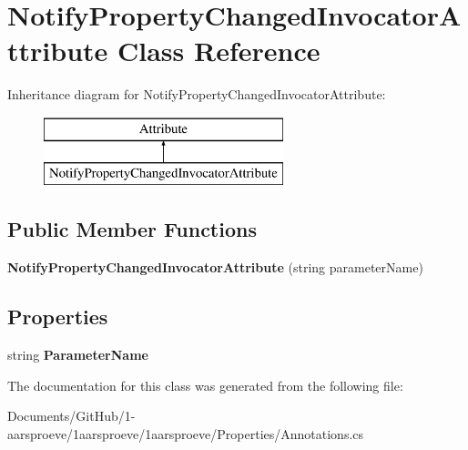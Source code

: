 \hypertarget{class_notify_property_changed_invocator_attribute}{}\section{Notify\+Property\+Changed\+Invocator\+Attribute Class Reference}
\label{class_notify_property_changed_invocator_attribute}
Inheritance diagram for Notify\+Property\+Changed\+Invocator\+Attribute\+:\begin{figure}[H]
\begin{center}
\leavevmode
\includegraphics[height=2.000000cm]{class_notify_property_changed_invocator_attribute}
\end{center}
\end{figure}
\subsection*{Public Member Functions}
\begin{DoxyCompactItemize}
\item 
\hypertarget{class_notify_property_changed_invocator_attribute_a53ea804fe542cdfff5c0ffbb47fdaeb0}{}{\bfseries Notify\+Property\+Changed\+Invocator\+Attribute} (string parameter\+Name)\label{class_notify_property_changed_invocator_attribute_a53ea804fe542cdfff5c0ffbb47fdaeb0}

\end{DoxyCompactItemize}
\subsection*{Properties}
\begin{DoxyCompactItemize}
\item 
\hypertarget{class_notify_property_changed_invocator_attribute_a156a54b467974741191e07b4812442ac}{}string {\bfseries Parameter\+Name}\label{class_notify_property_changed_invocator_attribute_a156a54b467974741191e07b4812442ac}

\end{DoxyCompactItemize}


The documentation for this class was generated from the following file\+:\begin{DoxyCompactItemize}
\item 
Documents/\+Git\+Hub/1-\/aarsproeve/1aarsproeve/1aarsproeve/\+Properties/Annotations.\+cs\end{DoxyCompactItemize}
